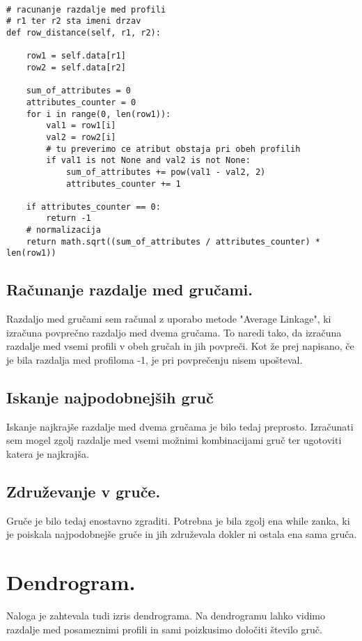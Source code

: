 \documentclass[a4paper,11pt]{article}
\begin{document}
\newpage
\begin{lstlisting}

# racunanje razdalje med profili
# r1 ter r2 sta imeni drzav
def row_distance(self, r1, r2):

    row1 = self.data[r1]
    row2 = self.data[r2]

    sum_of_attributes = 0
    attributes_counter = 0
    for i in range(0, len(row1)):
        val1 = row1[i]
        val2 = row2[i]
        # tu preverimo ce atribut obstaja pri obeh profilih
        if val1 is not None and val2 is not None:
            sum_of_attributes += pow(val1 - val2, 2)
            attributes_counter += 1

    if attributes_counter == 0:
        return -1
    # normalizacija
    return math.sqrt((sum_of_attributes / attributes_counter) * len(row1))

\end{lstlisting}

\subsection{Računanje razdalje med gručami.}
Razdaljo med gručami sem računal z uporabo metode "Average Linkage", ki izračuna povprečno razdaljo med dvema gručama. To naredi tako, da izračuna razdalje med vsemi profili v obeh gručah in jih povpreči. Kot že prej napisano, če je bila razdalja med profiloma -1, je pri povprečenju nisem upošteval.

\subsection{Iskanje najpodobnejših gruč}
Iskanje najkrajše razdalje med dvema gručama je bilo tedaj preprosto. Izračunati sem mogel zgolj razdalje med vsemi možnimi kombinacijami gruč ter ugotoviti katera je najkrajša.

\subsection{Združevanje v gruče.}
Gruče je bilo tedaj enostavno zgraditi. Potrebna je bila zgolj ena while zanka, ki je poiskala najpodobnejše gruče in jih združevala dokler ni ostala ena sama gruča.

\newpage

\section{Dendrogram.}
Naloga je zahtevala tudi izris dendrograma. Na dendrogramu lahko vidimo razdalje med posameznimi profili in sami poizkusimo določiti število gruč.
\end{document}
